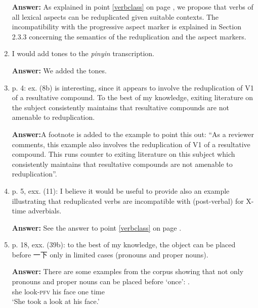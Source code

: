 \documentclass[fleqn,twoside]{article}
\begin{document}
\begin{enumerate}

\textbf{Answer:}
As explained in point \ref{verbclass} on page \pageref{verbclass}, we propose that verbs of all lexical aspects can be reduplicated given suitable contexts.
The incompatibility with the progressive aspect marker is explained in Section 2.3.3 concerning the semantics of the reduplication and the aspect markers.


\item
I would add tones to the \textit{pinyin} transcription.

\textbf{Answer:} We added the tones.

\item
p. 4: ex. (8b) is interesting, since it appears to involve the reduplication of V1 of a resultative compound. To the best of my knowledge, exiting literature on the subject consistently maintains that resultative compounds are not amenable to reduplication.


\textbf{Answer:}A footnote is added to the example to point this out: 
``As a reviewer comments, this example also involves the reduplication of V1 of a resultative compound. 
This runs counter to exiting literature on this subject which consistently maintains that resultative compounds are not amenable to reduplication''.

\item
p. 5, exx. (11): I believe it would be useful to provide also an example illustrating that reduplicated verbs are incompatible with (post-verbal) for X-time adverbials.

\textbf{Answer:} See the answer to point \ref{verbclass} on page \pageref{verbclass}.

\item
p. 18, exx. (39b): to the best of my knowledge, the object can be placed before 一下  only in limited cases (pronouns and proper nouns).

\noindent
\textbf{Answer:}
There are some examples from the corpus showing that not only pronouns and proper nouns can be placed before   `once':
\ea%
\gll {}     .\\
she look-\textsc{pfv} his face one time\\
\glt `She took a look at his face.'


\end{enumerate}
\end{document}
